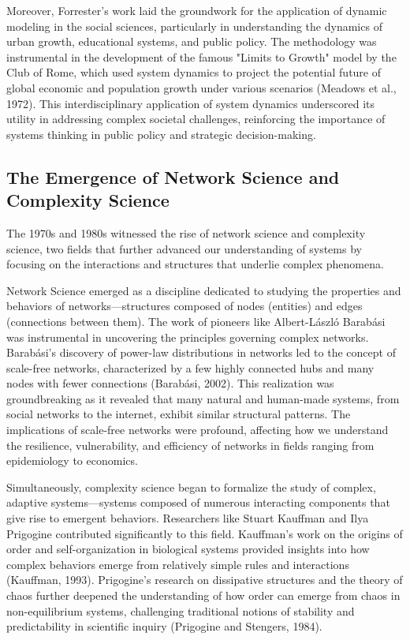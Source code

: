 \documentclass[twocolumn]{article}
\begin{document}
\textcolor{primary}{Moreover, Forrester’s work laid the groundwork for the application of dynamic modeling in the social sciences, particularly in understanding the dynamics of urban growth, educational systems, and public policy. The methodology was instrumental in the development of the famous "Limits to Growth" model by the Club of Rome, which used system dynamics to project the potential future of global economic and population growth under various scenarios (Meadows et al., 1972). This interdisciplinary application of system dynamics underscored its utility in addressing complex societal challenges, reinforcing the importance of systems thinking in public policy and strategic decision-making.}

\subsection{The Emergence of Network Science and Complexity Science}

\textcolor{primary}{The 1970s and 1980s witnessed the rise of network science and complexity science, two fields that further advanced our understanding of systems by focusing on the interactions and structures that underlie complex phenomena.}


\textcolor{secondary}{Network Science emerged as a discipline dedicated to studying the properties and behaviors of networks—structures composed of nodes (entities) and edges (connections between them). The work of pioneers like Albert-László Barabási was instrumental in uncovering the principles governing complex networks. Barabási’s discovery of power-law distributions in networks led to the concept of scale-free networks, characterized by a few highly connected hubs and many nodes with fewer connections (Barabási, 2002). This realization was groundbreaking as it revealed that many natural and human-made systems, from social networks to the internet, exhibit similar structural patterns. The implications of scale-free networks were profound, affecting how we understand the resilience, vulnerability, and efficiency of networks in fields ranging from epidemiology to economics.}



\textcolor{primary}{Simultaneously, complexity science began to formalize the study of complex, adaptive systems—systems composed of numerous interacting components that give rise to emergent behaviors. Researchers like Stuart Kauffman and Ilya Prigogine contributed significantly to this field. Kauffman’s work on the origins of order and self-organization in biological systems provided insights into how complex behaviors emerge from relatively simple rules and interactions (Kauffman, 1993). Prigogine’s research on dissipative structures and the theory of chaos further deepened the understanding of how order can emerge from chaos in non-equilibrium systems, challenging traditional notions of stability and predictability in scientific inquiry (Prigogine and Stengers, 1984).}
\end{document}
